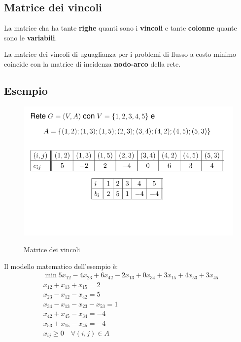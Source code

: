 \subsection{Matrice dei vincoli}

La matrice cha ha tante \textbf{righe} quanti sono i \textbf{vincoli} e tante \textbf{colonne}
quante sono le \textbf{variabili}.

La matrice dei vincoli di uguaglianza per i problemi di flusso a costo minimo coincide
con la matrice di incidenza \textbf{nodo-arco} della rete.

\subsection{Esempio}
\begin{figure}[!ht]
	\centering
	\includegraphics[scale=0.4]{./images/matrice_vincoli.png}
	\label{fig:matrice_vincoli}
	\caption{Matrice dei vincoli}
\end{figure}

Il modello matematico dell'esempio è:
\begin{align}
	 & \min 5x_{12} - 4x_{23} + 6x_{42} - 2x_{13} + 0x_{34} + 3x_{15} + 4x_{53} + 3x_{45} \\
	 & x_{12} + x_{13} + x_{15} = 2                                                       \\
	 & x_{23} - x_{12} - x_{42} = 5                                                       \\
	 & x_{34} - x_{13} - x_{23} - x_{53} = 1                                              \\
	 & x_{42} + x_{45} - x_{34} = -4                                                      \\
	 & x_{53} + x_{15} - x_{45} = -4                                                      \\
	 & x_{ij} \geq 0 \quad \forall (i, j) \in A
\end{align}

